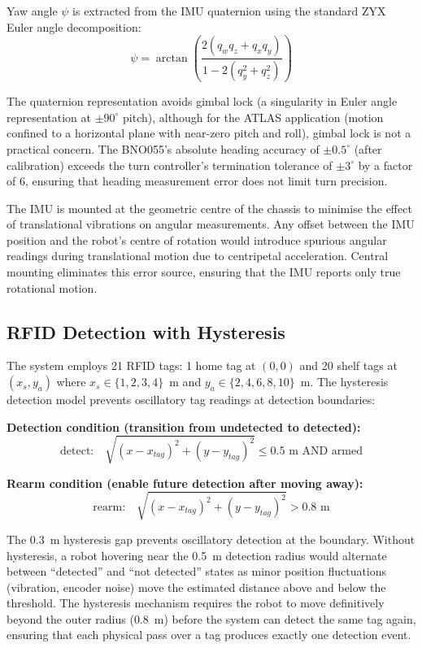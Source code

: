 \documentclass[12pt,a4paper,oneside]{report}
\begin{document}
Yaw angle $\psi$ is extracted from the IMU quaternion using the standard ZYX Euler angle decomposition:
\begin{equation}
\psi = \arctan\left(\frac{2(q_w q_z + q_x q_y)}{1 - 2(q_y^2 + q_z^2)}\right)
\label{eq:yaw_from_quat}
\end{equation}

The quaternion representation avoids gimbal lock (a singularity in Euler angle representation at $\pm 90^{\circ}$ pitch), although for the ATLAS application (motion confined to a horizontal plane with near-zero pitch and roll), gimbal lock is not a practical concern. The BNO055's absolute heading accuracy of $\pm 0.5^{\circ}$ (after calibration) exceeds the turn controller's termination tolerance of $\pm 3^{\circ}$ by a factor of 6, ensuring that heading measurement error does not limit turn precision.

The IMU is mounted at the geometric centre of the chassis to minimise the effect of translational vibrations on angular measurements. Any offset between the IMU position and the robot's centre of rotation would introduce spurious angular readings during translational motion due to centripetal acceleration. Central mounting eliminates this error source, ensuring that the IMU reports only true rotational motion.

\subsection{RFID Detection with Hysteresis}

The system employs 21 RFID tags: 1 home tag at $(0, 0)$ and 20 shelf tags at $(x_s, y_a)$ where $x_s \in \{1, 2, 3, 4\}$~m and $y_a \in \{2, 4, 6, 8, 10\}$~m. The hysteresis detection model prevents oscillatory tag readings at detection boundaries:

\textbf{Detection condition (transition from undetected to detected):}
\begin{equation}
\text{detect:} \quad \sqrt{(x - x_{tag})^2 + (y - y_{tag})^2} \leq 0.5 \text{~m AND armed}
\label{eq:rfid_detect}
\end{equation}

\textbf{Rearm condition (enable future detection after moving away):}
\begin{equation}
\text{rearm:} \quad \sqrt{(x - x_{tag})^2 + (y - y_{tag})^2} > 0.8 \text{~m}
\label{eq:rfid_rearm}
\end{equation}

The 0.3~m hysteresis gap prevents oscillatory detection at the boundary. Without hysteresis, a robot hovering near the 0.5~m detection radius would alternate between ``detected'' and ``not detected'' states as minor position fluctuations (vibration, encoder noise) move the estimated distance above and below the threshold. The hysteresis mechanism requires the robot to move definitively beyond the outer radius (0.8~m) before the system can detect the same tag again, ensuring that each physical pass over a tag produces exactly one detection event.
\end{document}
